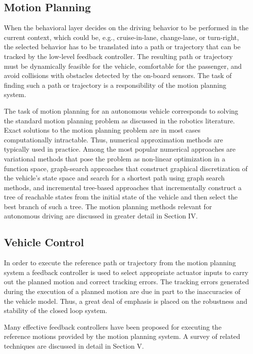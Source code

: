 \subsection{Motion Planning}
When the behavioral layer decides on the driving behavior to be performed in the current context, which could be, e.g., cruise-in-lane, change-lane, or turn-right, the selected behavior has to be translated into a path or trajectory that can be tracked by the low-level feedback controller. The resulting path or trajectory must be dynamically feasible for the vehicle, comfortable for the passenger, and avoid collisions with obstacles detected by the on-board sensors. The task of finding such a path or trajectory is a responsibility of the motion planning system.

The task of motion planning for an autonomous vehicle corresponds to solving the standard motion planning problem as discussed in the robotics literature. Exact solutions to the motion planning problem are in most cases computationally intractable. Thus, numerical approximation methods are typically used in practice. Among the most popular numerical approaches are variational methods that pose the problem as non-linear optimization in a function space, graph-search approaches that construct graphical discretization of the vehicle’s state space and search for a shortest path using graph search methods, and incremental tree-based approaches that incrementally construct a tree of reachable states from the initial state of the vehicle and then select the best branch of such a tree. The motion planning methods relevant for autonomous driving are discussed in greater detail in Section IV.

\subsection{Vehicle Control}
In order to execute the reference path or trajectory from the motion planning system a feedback controller is used to select appropriate actuator inputs to carry out the planned motion and correct tracking errors. The tracking errors generated during the execution of a planned motion are due in part to the inaccuracies of the vehicle model. Thus, a great deal of emphasis is placed on the robustness and stability of the closed loop system.

Many effective feedback controllers have been proposed for executing the reference motions provided by the motion planning system. A survey of related techniques are discussed in detail in Section V.

